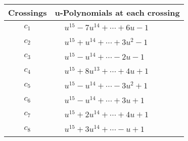 \documentclass[1p]{elsarticle_modified}
\theoremstyle{definition}
\begin{document}
\begin{tabular}{m{50pt}|m{274pt}}
Crossings & \hspace{64pt}u-Polynomials at each crossing \\
\hline $$\begin{aligned}c_{1}\end{aligned}$$&$\begin{aligned}
&u^{15}-7 u^{14}+\cdots+6 u-1
\end{aligned}$\\
\hline $$\begin{aligned}c_{2}\end{aligned}$$&$\begin{aligned}
&u^{15}+u^{14}+\cdots+3 u^2-1
\end{aligned}$\\
\hline $$\begin{aligned}c_{3}\end{aligned}$$&$\begin{aligned}
&u^{15}- u^{14}+\cdots-2 u-1
\end{aligned}$\\
\hline $$\begin{aligned}c_{4}\end{aligned}$$&$\begin{aligned}
&u^{15}+8 u^{13}+\cdots+4 u+1
\end{aligned}$\\
\hline $$\begin{aligned}c_{5}\end{aligned}$$&$\begin{aligned}
&u^{15}- u^{14}+\cdots-3 u^2+1
\end{aligned}$\\
\hline $$\begin{aligned}c_{6}\end{aligned}$$&$\begin{aligned}
&u^{15}- u^{14}+\cdots+3 u+1
\end{aligned}$\\
\hline $$\begin{aligned}c_{7}\end{aligned}$$&$\begin{aligned}
&u^{15}+2 u^{14}+\cdots+4 u+1
\end{aligned}$\\
\hline $$\begin{aligned}c_{8}\end{aligned}$$&$\begin{aligned}
&u^{15}+3 u^{14}+\cdots- u+1
\end{aligned}$\\

\end{tabular}
\end{document}

